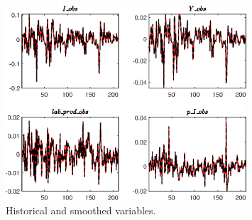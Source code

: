  
\begin{figure}[H]
\centering 
\includegraphics[width=0.80\textwidth]{BRS_fd/graphs/BRS_fd_HistoricalAndSmoothedVariables1}
\caption{Historical and smoothed variables.}\label{Fig:HistoricalAndSmoothedVariables:1}
\end{figure}


